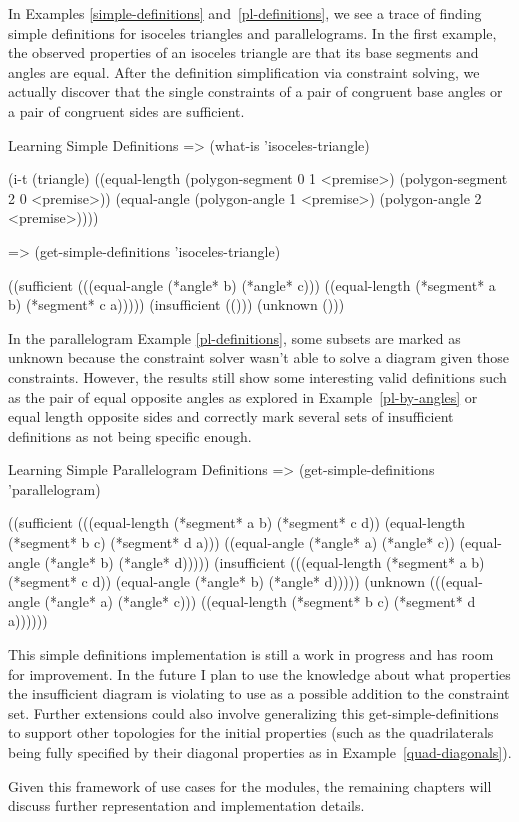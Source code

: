 In Examples \ref{simple-definitions} and~\ref{pl-definitions}, we see
a trace of finding simple definitions for isoceles triangles and
parallelograms. In the first example, the observed properties of an
isoceles triangle are that its base segments and angles are equal. After
the definition simplification via constraint solving, we actually
discover that the single constraints of a pair of congruent base
angles or a pair of congruent sides are sufficient.

\begin{repl-example}
[label=simple-definitions]
{Learning Simple Definitions}
=> (what-is 'isoceles-triangle)

(i-t
 (triangle)
 ((equal-length (polygon-segment 0 1 <premise>)
                (polygon-segment 2 0 <premise>))
  (equal-angle (polygon-angle 1 <premise>) (polygon-angle 2 <premise>))))

=> (get-simple-definitions 'isoceles-triangle)

((sufficient
  (((equal-angle (*angle* b) (*angle* c)))
   ((equal-length (*segment* a b) (*segment* c a)))))
 (insufficient (()))
 (unknown ()))
\end{repl-example}

In the parallelogram Example \ref{pl-definitions}, some subsets are
marked as unknown because the constraint solver wasn't able to solve a diagram
given those constraints. However, the results still show some
interesting valid definitions such as the pair of equal opposite
angles as explored in Example~\ref{pl-by-angles} or equal length
opposite sides and correctly mark several sets of insufficient
definitions as not being specific enough.

\begin{repl-example}
[label=pl-definitions]
{Learning Simple Parallelogram Definitions}
=> (get-simple-definitions 'parallelogram)

((sufficient
  (((equal-length (*segment* a b) (*segment* c d))
    (equal-length (*segment* b c) (*segment* d a)))
   ((equal-angle (*angle* a) (*angle* c))
    (equal-angle (*angle* b) (*angle* d)))))
 (insufficient
  (((equal-length (*segment* a b) (*segment* c d))
    (equal-angle (*angle* b) (*angle* d)))))
 (unknown
  (((equal-angle (*angle* a) (*angle* c)))
   ((equal-length (*segment* b c) (*segment* d a))))))
\end{repl-example}

This simple definitions implementation is still a work in progress and
has room for improvement. In the future I plan to use the knowledge
about what properties the insufficient diagram is violating to use as
a possible addition to the constraint set. Further extensions could
also involve generalizing this get-simple-definitions to support other
topologies for the initial properties (such as the quadrilaterals
being fully specified by their diagonal properties as in
Example~\ref{quad-diagonals}).

Given this framework of use cases for the modules, the remaining
chapters will discuss further representation and implementation
details.
